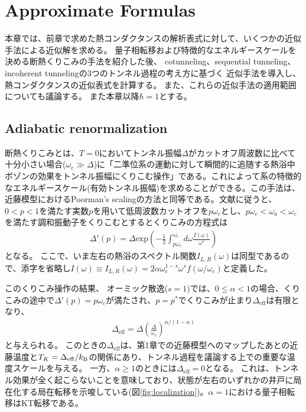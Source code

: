 \section{Approximate Formulas}

本章では、前章で求めた熱コンダクタンスの解析表式に対して、いくつかの近似手法による近似解を求める。
量子相転移および特徴的なエネルギースケールを決める断熱くりこみの手法を紹介した後、
cotunneling、sequential tunneling、incoherent tunnelingの3つのトンネル過程の考え方に基づく
近似手法を導入し、熱コンダクタンスの近似表式を計算する。
また、これらの近似手法の適用範囲についても議論する。
また本章以降$\hbar=1$とする。

\subsection{Adiabatic renormalization}

断熱くりこみとは、$T=0$においてトンネル振幅$\Delta$がカットオフ周波数に比べて十分小さい場合($\omega_c\gg\Delta$)に「二準位系の運動に対して瞬間的に追随する熱浴中ボゾンの効果をトンネル振幅にくりこむ操作」である。これによって系の特徴的なエネルギースケール(有効トンネル振幅)を求めることができる。この手法は、近藤模型におけるPoorman's scalingの方法と同等である。文献\cite{Leggett87}に従うと、
$0<p<1$を満たす実数$p$を用いて低周波数カットオフを$p\omega_c$とし、$p \omega_c<\omega_a<\omega_c$を満たす調和振動子をくりこむとするとくりこみの方程式は
\begin{eqnarray}
	\Delta'(p)=\Delta \mathrm{exp}\left(-\frac{1}{2}\int_{p \omega_c}^{\omega_c}d\omega\frac{I(\omega)}{\omega^2}\right)
	\label{kurikomi}
\end{eqnarray}
となる。
ここで、いま左右の熱浴のスペクトル関数$I_{L,R}(\omega)$は同型であるので、添字を省略し$I(\omega)\equiv I_{L,R}(\omega)=2\alpha\omega_c^{1-s}\omega^sf(\omega/\omega_c)$と定義した。

このくりこみ操作の結果、
オーミック散逸($s=1$)では、$0\le \alpha < 1$の場合、くりこみの途中で$\Delta'(p)=p\omega_c$が満たされ、$p=p^{\ast}$でくりこみが止まり$\Delta_{\mathrm{eff}}$は有限となり、
\begin{eqnarray}
\Delta_{\mathrm{eff}} = \Delta \left(\frac{\Delta}{\omega_c} \right)^{\alpha/(1-\alpha)}
\end{eqnarray}
と与えられる。
このときの$\Delta_{\mathrm{eff}}$は、第1章での近藤模型へのマップしたあとの近藤温度と$T_K = \Delta_{\rm eff} /k_{\rm B}$の関係にあり\cite{Leggett87,SaitoKato13}、トンネル過程を議論する上での重要な温度スケールを与える。
一方、$\alpha \ge 1$のときには$\Delta_{\mathrm{eff}}=0$となる。
これは、トンネル効果が全く起こらないことを意味しており、状態が左右のいずれかの井戸に局在化する局在転移を示唆している(図\ref{fig:localization})。$\alpha = 1$における量子相転移はKT転移である。


